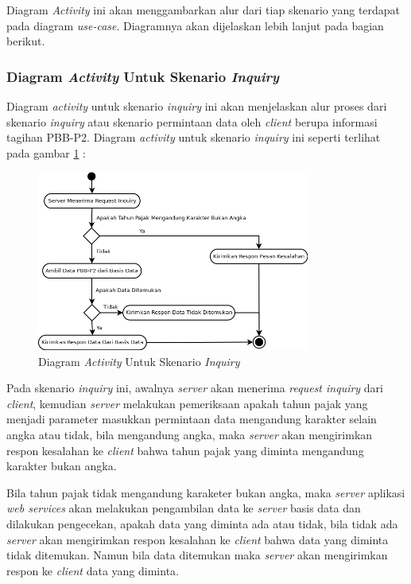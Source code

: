 \documentclass[pdftex,12pt, oneside]{article}
\begin{document}
Diagram \textit{Activity} ini akan menggambarkan alur dari tiap skenario yang terdapat pada diagram \textit{use-case}. Diagramnya akan dijelaskan lebih lanjut pada bagian berikut.

\subsubsection{Diagram \textit{Activity} Untuk Skenario \textit{Inquiry}}

Diagram \textit{activity} untuk skenario \textit{inquiry} ini akan menjelaskan alur proses dari skenario \textit{inquiry} atau skenario permintaan data oleh \textit{client} berupa informasi tagihan PBB-P2. Diagram \textit{activity} untuk skenario \textit{inquiry} ini seperti terlihat pada gambar \ref{fig:uml-act-inquiry} :

\begin{figure}[H]
  \centering
  \includegraphics[width=0.8\textwidth]{./resources/uml/uml-act-inquiry}
  \caption{Diagram \textit{Activity} Untuk Skenario \textit{Inquiry}}
  \label{fig:uml-act-inquiry}
\end{figure}

Pada skenario \textit{inquiry} ini, awalnya \textit{server} akan menerima \textit{request inquiry} dari \textit{client}, kemudian \textit{server} melakukan pemeriksaan apakah tahun pajak yang menjadi parameter masukkan permintaan data mengandung karakter selain angka atau tidak, bila mengandung angka, maka \textit{server} akan mengirimkan respon kesalahan ke \textit{client} bahwa tahun pajak yang diminta mengandung karakter bukan angka.

Bila tahun pajak tidak mengandung karaketer bukan angka, maka \textit{server} aplikasi \textit{web services} akan melakukan pengambilan data ke \textit{server} basis data dan dilakukan pengecekan, apakah data yang diminta ada atau tidak, bila tidak ada \textit{server} akan mengirimkan respon kesalahan ke \textit{client} bahwa data yang diminta tidak ditemukan. Namun bila data ditemukan maka \textit{server} akan mengirimkan respon ke \textit{client} data yang diminta.
\end{document}

